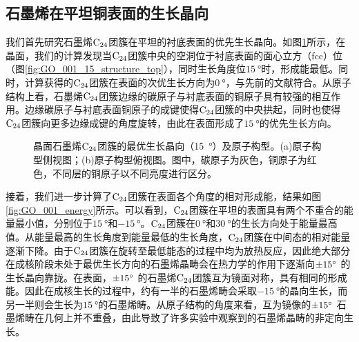 \subsection{石墨烯在平坦铜表面的生长晶向}
我们首先研究石墨烯$\rm{C_{24}}$团簇在平坦的衬底表面的优先生长晶向。如图\ref{fig:GO_001_15_structure}所示，在晶面，我们的计算发现当$\rm{C_{24}}$团簇中央的空洞位于衬底表面的面心立方（fcc）位（图\ref{fig:GO_001_15_structure_top}），同时生长角度位$\SI{15}{\degree}$时，形成能最低。同时，计算获得的$\rm{C_{24}}$团簇在表面的次优生长方向为$\SI{0}{\degree}$，与先前的文献符合。从原子结构上看，石墨烯$\rm{C_{24}}$团簇边缘的碳原子与衬底表面的铜原子具有较强的相互作用。边缘碳原子与衬底表面铜原子的成键使得$\rm{C_{24}}$团簇的中央拱起，同时也使得$\rm{C_{24}}$团簇向更多边缘成键的角度旋转，由此在表面形成了$\SI{15}{\degree}$的优先生长方向。

\begin{figure}[htb]

    \caption{晶面石墨烯$\rm{C_{24}}$团簇的最优生长晶向（\SI{15}{\degree}）及原子构型。(a)原子构型侧视图；(b)原子构型俯视图。图中，碳原子为灰色，铜原子为红色，不同层的铜原子以不同亮度进行区分。}
    \label{fig:GO_001_15_structure}
\end{figure}

接着，我们进一步计算了$\rm{C_{24}}$团簇在表面各个角度的相对形成能，结果如图\ref{fig:GO_001_energy}所示。可以看到，$\rm{C_{24}}$团簇在平坦的表面具有两个不重合的能量最小值，分别位于$\SI{+15}{\degree}$和$\SI{-15}{\degree}$。$\rm{C_{24}}$团簇在$\SI{0}{\degree}$和$\SI{30}{\degree}$的生长方向处于能量最高值。从能量最高的生长角度到能量最低的生长角度，$\rm{C_{24}}$团簇在中间态的相对能量逐渐下降。由于$\rm{C_{24}}$团簇在旋转至最低能态的过程中均为放热反应，因此绝大部分在成核阶段未处于最优生长方向的石墨烯晶畴会在热力学的作用下逐渐向$\SI{\pm 15}{\degree}$ 的生长晶向靠拢。在表面，$\SI{\pm 15}{\degree}$ 的石墨烯$\rm{C_{24}}$团簇互为镜面对称，具有相同的形成能。因此在成核生长的过程中，约有一半的石墨烯畴会采取$\SI{-15}{\degree}$的晶向生长，而另一半则会生长为$\SI{+15}{\degree}$的石墨烯畴。从原子结构的角度来看，互为镜像的$\SI{\pm 15}{\degree}$ 石墨烯畴在几何上并不重叠，由此导致了许多实验中观察到的石墨烯晶畴的非定向生长。

